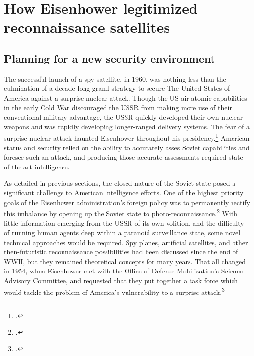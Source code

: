 \documentclass{report}
\begin{document}
\section{How Eisenhower legitimized reconnaissance satellites}
\subsection{Planning for a new security environment}
The successful launch of a spy satellite, in 1960, was nothing less than the culmination of a decade-long grand strategy to secure The United States of America against a surprise nuclear attack. Though the US air-atomic capabilities in the early Cold War discouraged the USSR from making more use of their conventional military advantage, the USSR quickly developed their own nuclear weapons and was rapidly developing longer-ranged delivery systems. The fear of a surprise nuclear attack haunted Eisenhower throughout his presidency.\footcite[p.~68]{killian_sputnik_1977} American status and security relied on the ability to accurately asses Soviet capabilities and foresee such an attack, and producing those accurate assessments required state-of-the-art intelligence.

As detailed in previous sections, the closed nature of the Soviet state posed a significant challenge to American intelligence efforts. One of the highest priority goals of the Eisenhower administration's foreign policy was to permanently rectify this imbalance by opening up the Soviet state to photo-reconnaissance.\footcite[p.~65]{hayes_struggling_1994} With little information emerging from the USSR of its own volition, and the difficulty of running human agents deep within a paranoid surveillance state, some novel technical approaches would be required. Spy planes, artificial satellites, and other then-futuristic reconnaissance possibilities had been discussed since the end of WWII, but they remained theoretical concepts for many years. That all changed in 1954, when Eisenhower met with the Office of Defense Mobilization's Science Advisory Committee, and requested that they put together a task force which would tackle the problem of America's vulnerability to a surprise attack.\footcite[p.~67. The president's science advisor described this moment as the starting point for ``any complete account of how science advice was mobilized for the use of President Eisenhower.'']{killian_sputnik_1977}
\end{document}

